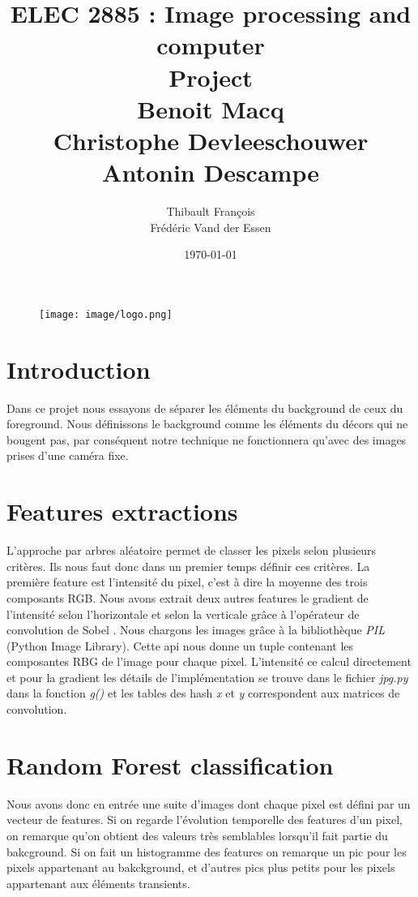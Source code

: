 \documentclass[11pt,a4paper]{report}
\title{ELEC 2885 : Image processing and computer  \\ Project \\
Benoit Macq \\ Christophe Devleeschouwer \\ Antonin Descampe}
\author{Thibault François \\ Frédéric Vand der Essen}
\date{\today}
\begin{document}
	\begin{titlepage}		
		\begin{figure}[tbp]
			\begin{center}
				\texttt{[image: image/logo.png]}
			\end{center}
		\end{figure}
		\maketitle
	\end{titlepage}

\section{Introduction}
Dans ce projet nous essayons de séparer les éléments du background de ceux du foreground. Nous définissons le background comme les éléments du décors
qui ne bougent pas, par conséquent notre technique ne fonctionnera qu'avec des images prises d'une caméra fixe. 

\section{Features extractions}
L'approche par arbres aléatoire permet de classer les pixels selon plusieurs critères. Ils nous faut donc dans un premier temps définir ces critères. La première feature est l'intensité du pixel, c'est à dire la moyenne des trois composants RGB. Nous avons extrait deux autres features le gradient de l'intensité selon l'horizontale et selon la verticale \cite{gradient} grâce à l'opérateur de convolution de Sobel \cite{sobel}. Nous chargons les images grâce à la bibliothèque \textit{PIL} (Python Image Library). Cette api nous donne un tuple contenant les composantes RBG de l'image pour chaque pixel. L'intensité ce calcul directement et pour la gradient les détails de l'implémentation se trouve dans le fichier \textit{jpg.py} dans la fonction \textit{g()} et les tables des hash \textit{x} et \textit{y} correspondent aux matrices de convolution.  


\section{Random Forest classification}

	Nous avons donc en entrée une suite d'images dont chaque pixel est défini par un vecteur de features.
	Si on regarde l'évolution temporelle des features d'un pixel, on remarque qu'on obtient des valeurs très
	semblables lorsqu'il fait partie du bakcground. Si on fait un histogramme des features on remarque un pic
	pour les pixels appartenant au bakckground, et d'autres pics plus petits pour les pixels appartenant aux
	éléments transients. 
\end{document}
